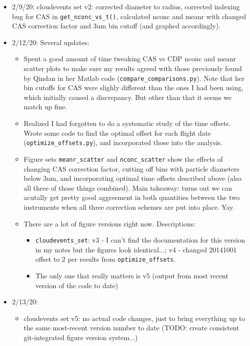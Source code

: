 \documentclass{article}
\begin{document}
\begin{itemize}
\begin{itemize}
		\end{itemize}
	\item 2/9/20: cloudevents set v2: corrected diameter to radius, corrected indexing bug for CAS in \texttt{get\_nconc\_vs\_t()}, calculated nconc and meanr with changed CAS correction factor and 3um bin cutoff (and graphed accordingly).\\
	\item 2/12/20: Several updates:
	\begin{itemize}
		\item Spent a good amount of time tweaking CAS vs CDP nconc and meanr scatter plots to make sure my results agreed with those previously found by Qindan in her Matlab code (\texttt{compare\_comparisons.py}). Note that her bin cutoffs for CAS were slighly different than the ones I had been using, which initially caused a discrepancy. But other than that it seems we match up fine.
		\item Realized I had forgotten to do a systematic study of the time offsets. Wrote some code to find the optimal offset for each flight date (\texttt{optimize\_offsets.py}), and incorporated those into the analysis. 
		\item Figure sets \texttt{meanr\_scatter} and \texttt{nconc\_scatter} show the effects of changing CAS correction factor, cutting off bins with particle diameters below 3um, and incorporating optimal time offsets described above (also all three of those things combined). Main takeaway: turns out we can acutally get pretty good aggreement in both quantities between the two instruments when all three correction schemes are put into place. Yay.
		\item There are a lot of figure versions right now. Descriptions: 
		\begin{itemize}
			\item \texttt{cloudevents\_set}: v3 - I can't find the documentation for this version in my notes but the figures look identical...; v4 - changed 20141001 offset to 2 per results from \texttt{optimize\_offsets}.
			\item The only one that really matters is v5 (output from most recent version of the code to date)
		\end{itemize}
	\end{itemize}
	\item 2/13/20:
	\begin{itemize}
		\item cloudevents set v5: no actual code changes, just to bring everything up to the same most-recent version number to date (TODO: create consistent git-integrated figure version system...)

\end{itemize}
\end{itemize}
\end{document}
